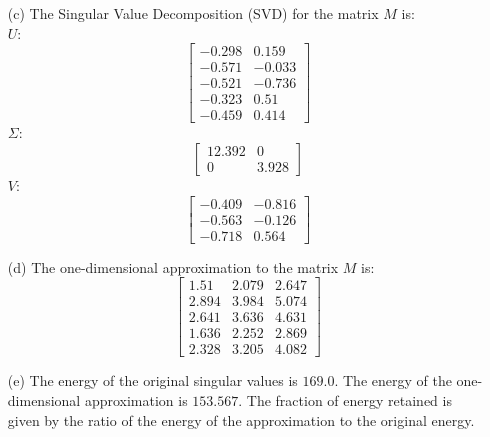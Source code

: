 \documentclass{article}
\begin{document}
\begin{enumerate}
    \item[(c)] The Singular Value Decomposition (SVD) for the matrix \( M \) is:\\
    \( U \):
    \[
    \begin{bmatrix}
        -0.298 & 0.159 \\
        -0.571 & -0.033 \\
        -0.521 & -0.736 \\
        -0.323 & 0.51 \\
        -0.459 & 0.414
    \end{bmatrix}
    \]
    \( \Sigma \):
    \[
    \begin{bmatrix}
        12.392 & 0 \\
        0 & 3.928
    \end{bmatrix}
    \]
    \( V \):
    \[
    \begin{bmatrix}
        -0.409 & -0.816 \\
        -0.563 & -0.126 \\
        -0.718 & 0.564
    \end{bmatrix}
    \]

    \item[(d)] The one-dimensional approximation to the matrix \( M \) is:
    \[
    \begin{bmatrix}
        1.51 & 2.079 & 2.647 \\
        2.894 & 3.984 & 5.074 \\
        2.641 & 3.636 & 4.631 \\
        1.636 & 2.252 & 2.869 \\
        2.328 & 3.205 & 4.082
    \end{bmatrix}
    \]

    \item[(e)] The energy of the original singular values is \( 169.0 \). The energy of the one-dimensional approximation is \( 153.567 \). The fraction of energy retained is given by the ratio of the energy of the approximation to the original energy.
\end{enumerate}
\end{document}
